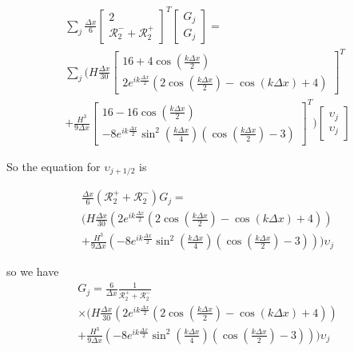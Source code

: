 \begin{multline*}
\sum_j \frac{\Delta x}{6}\begin{bmatrix} 2  \\ \mathcal{R}^-_2 + \mathcal{R}^+_2 \end{bmatrix}^T \begin{bmatrix} G_j  \\ G_j\end{bmatrix}  = \\\sum_j \Bigg(H\frac{\Delta x}{30}\begin{bmatrix} 16  + 4 \cos\left(\frac{k \Delta x}{2}\right) \\ 2e^{ik\frac{\Delta x}{2}}\left(2\cos\left(\frac{k \Delta x}{2}\right) - \cos\left({k \Delta x}\right) + 4\right)  \end{bmatrix}^T  \\+ \frac{H^3 }{9\Delta x}\begin{bmatrix}  16  -16\cos\left(\frac{k \Delta x}{2}\right) \\  -8e^{ik\frac{\Delta x}{2}} \sin^2\left(\frac{k \Delta x}{4}\right)\left(\cos\left(\frac{k \Delta x}{2}\right) - 3 \right)    \end{bmatrix}^T    \Bigg) \begin{bmatrix} \upsilon_j  \\ \upsilon_{j} \end{bmatrix}
\end{multline*}
 
 
 So the equation for $\upsilon_{j+1/2}$ is
 
 \begin{multline*}
 \frac{\Delta x}{6}\left(\mathcal{R}^+_2 +\mathcal{R}^-_2\right)  G_j = \\ \Bigg(H\frac{\Delta x}{30} \left(2e^{ik\frac{\Delta x}{2}} \left(2\cos\left(\frac{k \Delta x}{2}\right) - \cos\left({k \Delta x}\right) + 4\right)\right) \\+ \frac{H^3 }{9\Delta x}\left(-8e^{ik\frac{\Delta x}{2}} \sin^2\left(\frac{k \Delta x}{4}\right)\left(\cos\left(\frac{k \Delta x}{2}\right) - 3 \right) \right)   \Bigg)  \upsilon_{j}
 \end{multline*}
 
 so we have
  \begin{multline*}
 G_j = \frac{6}{\Delta x} \frac{1}{\mathcal{R}^+_2 +\mathcal{R}^-_2} \\ \times \Bigg(H\frac{\Delta x}{30} \left(2e^{ik\frac{\Delta x}{2}} \left(2\cos\left(\frac{k \Delta x}{2}\right) - \cos\left({k \Delta x}\right) + 4\right)\right) \\+ \frac{H^3 }{9\Delta x}\left(-8e^{ik\frac{\Delta x}{2}} \sin^2\left(\frac{k \Delta x}{4}\right)\left(\cos\left(\frac{k \Delta x}{2}\right) - 3 \right) \right)   \Bigg)  \upsilon_{j}
  \end{multline*}

